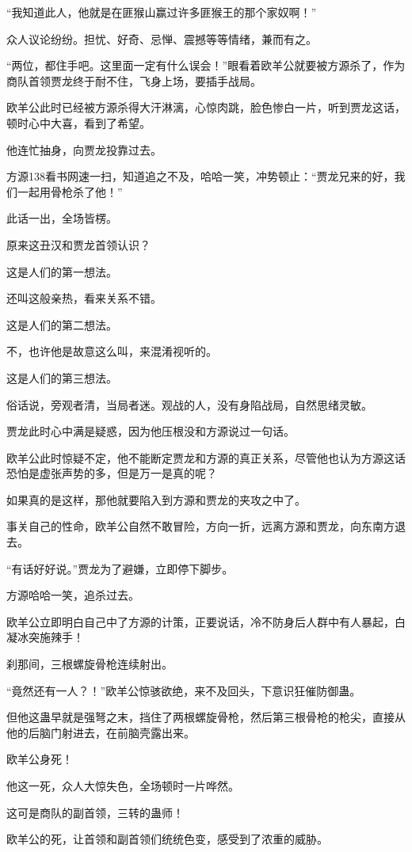 \begin{this_body}
“我知道此人，他就是在匪猴山赢过许多匪猴王的那个家奴啊！”

众人议论纷纷。担忧、好奇、忌惮、震撼等等情绪，兼而有之。

“两位，都住手吧。这里面一定有什么误会！”眼看着欧羊公就要被方源杀了，作为商队首领贾龙终于耐不住，飞身上场，要插手战局。

欧羊公此时已经被方源杀得大汗淋漓，心惊肉跳，脸色惨白一片，听到贾龙这话，顿时心中大喜，看到了希望。

他连忙抽身，向贾龙投靠过去。

方源138看书网速一扫，知道追之不及，哈哈一笑，冲势顿止：“贾龙兄来的好，我们一起用骨枪杀了他！”

此话一出，全场皆楞。

原来这丑汉和贾龙首领认识？

这是人们的第一想法。

还叫这般亲热，看来关系不错。

这是人们的第二想法。

不，也许他是故意这么叫，来混淆视听的。

这是人们的第三想法。

俗话说，旁观者清，当局者迷。观战的人，没有身陷战局，自然思绪灵敏。

贾龙此时心中满是疑惑，因为他压根没和方源说过一句话。

欧羊公此时惊疑不定，他不能断定贾龙和方源的真正关系，尽管他也认为方源这话恐怕是虚张声势的多，但是万一是真的呢？

如果真的是这样，那他就要陷入到方源和贾龙的夹攻之中了。

事关自己的性命，欧羊公自然不敢冒险，方向一折，远离方源和贾龙，向东南方退去。

“有话好好说。”贾龙为了避嫌，立即停下脚步。

方源哈哈一笑，追杀过去。

欧羊公立即明白自己中了方源的计策，正要说话，冷不防身后人群中有人暴起，白凝冰突施辣手！

刹那间，三根螺旋骨枪连续射出。

“竟然还有一人？！”欧羊公惊骇欲绝，来不及回头，下意识狂催防御蛊。

但他这蛊早就是强弩之末，挡住了两根螺旋骨枪，然后第三根骨枪的枪尖，直接从他的后脑门射进去，在前脑壳露出来。

欧羊公身死！

他这一死，众人大惊失色，全场顿时一片哗然。

这可是商队的副首领，三转的蛊师！

欧羊公的死，让首领和副首领们统统色变，感受到了浓重的威胁。


\end{this_body}
